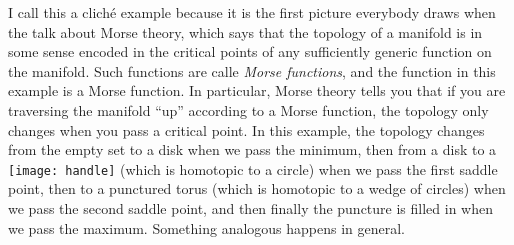 \begin{remark}
	I call this a cliché example because it is the first picture everybody draws when the talk about Morse theory, which says that the topology of a manifold is in some sense encoded in the critical points of any sufficiently generic function on the manifold. Such functions are calle \emph{Morse functions}, and the function in this example is a Morse function. In particular, Morse theory tells you that if you are traversing the manifold ``up'' according to a Morse function, the topology only changes when you pass a critical point. In this example, the topology changes from the empty set to a disk when we pass the minimum, then from a disk to a \texttt{[image: handle]} (which is homotopic to a circle) when we pass the first saddle point, then to a punctured torus (which is homotopic to a wedge of circles) when we pass the second saddle point, and then finally the puncture is filled in when we pass the maximum. Something analogous happens in general.
\end{remark}

